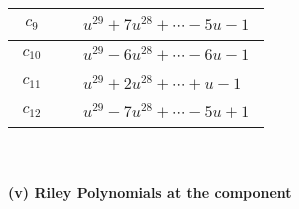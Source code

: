 \documentclass[1p]{elsarticle_modified}
\theoremstyle{definition}
\begin{document}
\begin{tabular}{m{50pt}|m{274pt}}
\hline $$\begin{aligned}c_{9}\end{aligned}$$&$\begin{aligned}
&u^{29}+7 u^{28}+\cdots-5 u-1
\end{aligned}$\\
\hline $$\begin{aligned}c_{10}\end{aligned}$$&$\begin{aligned}
&u^{29}-6 u^{28}+\cdots-6 u-1
\end{aligned}$\\
\hline $$\begin{aligned}c_{11}\end{aligned}$$&$\begin{aligned}
&u^{29}+2 u^{28}+\cdots+u-1
\end{aligned}$\\
\hline $$\begin{aligned}c_{12}\end{aligned}$$&$\begin{aligned}
&u^{29}-7 u^{28}+\cdots-5 u+1
\end{aligned}$\\
\hline
\end{tabular}\\~\\
\newpage\renewcommand{\arraystretch}{1}
\flushleft \textbf{(v) Riley Polynomials at the component}\newline \\
\end{document}
